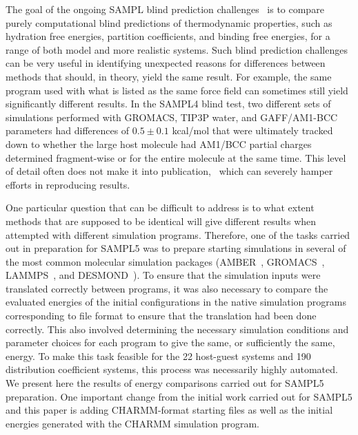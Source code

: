 The goal of the ongoing SAMPL blind prediction
challenges~\citep{Muddana2014SAMPL4,Muddana2012a,geballe_sampl2_2010,guthrie_blind_2009}
is to compare purely computational blind predictions of thermodynamic
properties, such as hydration free energies, partition coefficients,
and binding free energies, for a range of both model and more realistic
systems. Such blind prediction challenges can be very useful in
identifying unexpected reasons for differences between methods that
should, in theory, yield the same result. For example, the same program used
with what is listed as the same force field can sometimes still yield
significantly different results. In the SAMPL4 blind test, two
different sets of simulations performed with GROMACS, TIP3P water, and
GAFF/AM1-BCC parameters had differences of $0.5 \pm 0.1$
kcal/mol that were ultimately tracked down to whether the large host
molecule had AM1/BCC partial charges determined fragment-wise or for
the entire molecule at the same time. This level of detail often
does not make it into publication,~\cite{Monroe2014} which can severely hamper
efforts in reproducing results.

One particular question that can be difficult to address is to what
extent methods that are supposed to be identical will give different
results when attempted with different simulation programs.  Therefore,
one of the tasks carried out in preparation for SAMPL5 was to prepare
starting simulations in several of the most common molecular
simulation packages (AMBER~\citep{Amber14},
GROMACS~\citep{hess_gromacs_2008}, LAMMPS~\citep{plimpton_fast_1995},
and DESMOND~\citep{bowers_scalable_2006}). To ensure that the
simulation inputs were translated correctly between programs, it was
also necessary to compare the evaluated energies of the initial
configurations in the native simulation programs corresponding to file
format to ensure that the translation had been done correctly.  This
also involved determining the necessary simulation conditions and
parameter choices for each program to give the same, or sufficiently
the same, energy.  To make this task feasible for the 22 host-guest
systems and 190 distribution coefficient systems, this process was
necessarily highly automated. We present here the results of energy
comparisons carried out for SAMPL5 preparation.  One important change
from the initial work carried out for SAMPL5 and this paper is adding
CHARMM-format starting files as well as the initial energies generated
with the CHARMM simulation program.


